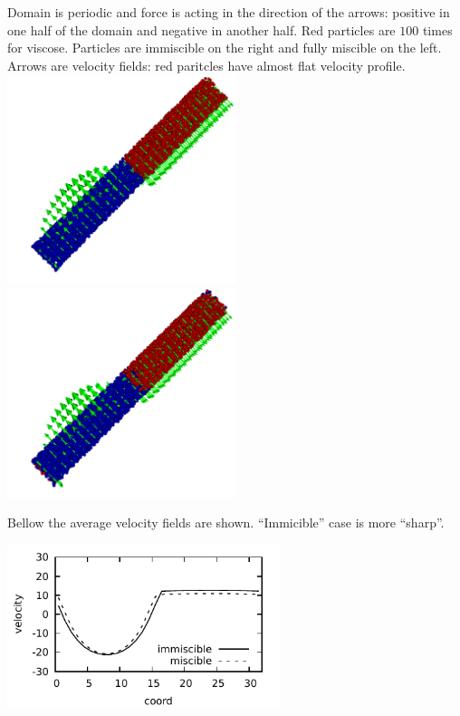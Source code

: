 Domain is periodic and force is acting in the direction of the arrows:
positive in one half of the domain and negative in another half.  Red
particles are $100$ times for viscose. Particles are immiscible on the
right and fully miscible on the left. Arrows are velocity fields: red
paritcles have almost flat velocity profile.
\includegraphics[width=0.5\textwidth]{i/flow/a/visit.png}
\includegraphics[width=0.5\textwidth]{i/flow/b/visit.png}


Bellow the average velocity fields are shown. ``Immicible'' case is
more ``sharp''.

\begin{center}
\includegraphics[width=0.6\textwidth]{i/flow/prof.pdf}
\end{center}
